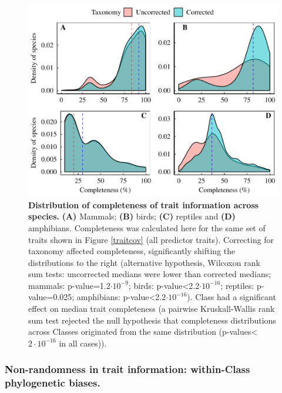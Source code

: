 \begin{figure}[h]
\centering
\includegraphics[scale=0.70]{figures/chapter2/Trait_coverage/Missing_values/Traitcompleteness}
\caption[Distribution of completeness of trait information across species]{\textbf{Distribution of completeness of trait information across species.} \textbf{(A)} Mammals; \textbf{(B)} birds; \textbf{(C)} reptiles and \textbf{(D)} amphibians. Completeness was calculated here for the same set of traits shown in Figure \ref{traitcov} (all predictor traits). Correcting for taxonomy affected completeness, significantly shifting the distributions to the right (alternative hypothesis, Wilcoxon rank sum tests: uncorrected medians were lower than corrected medians; mammals: p-value=1.2$\cdot10^{-9}$; birds: p-value<2.2$\cdot10^{-16}$; reptiles: p-value=0.025; amphibians: p-value<2.2$\cdot10^{-16}$). Class had a significant effect on median trait completeness (a pairwise Kruskall-Wallis rank sum test rejected the null hypothesis that completeness distributions across Classes originated from the same distribution (p-values<$2\cdot10^{-16}$ in all cases)).}
\label{traitcomp}
\end{figure}


\pagebreak
\subsubsection{Non-randomness in trait information: within-Class phylogenetic biases.}

